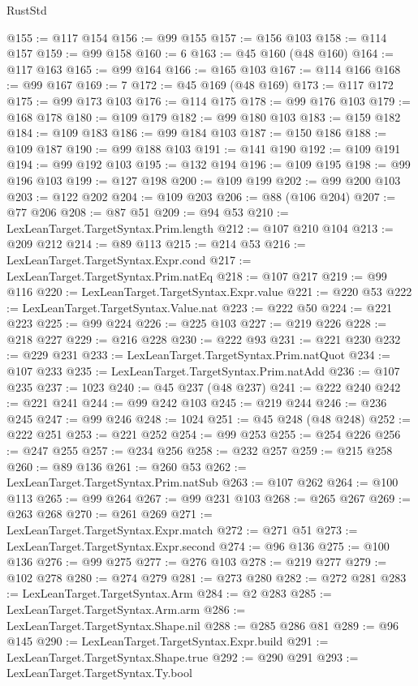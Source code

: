\begin{lexlean}{RustStd}
\begin{coremodule}
@155 := @117 @154
@156 := @99 @155
@157 := @156 @103
@158 := @114 @157
@159 := @99 @158
@160 := 6
@163 := @45 @160 (@48 @160)
@164 := @117 @163
@165 := @99 @164
@166 := @165 @103
@167 := @114 @166
@168 := @99 @167
@169 := 7
@172 := @45 @169 (@48 @169)
@173 := @117 @172
@175 := @99 @173 @103
@176 := @114 @175
@178 := @99 @176 @103
@179 := @168 @178
@180 := @109 @179
@182 := @99 @180 @103
@183 := @159 @182
@184 := @109 @183
@186 := @99 @184 @103
@187 := @150 @186
@188 := @109 @187
@190 := @99 @188 @103
@191 := @141 @190
@192 := @109 @191
@194 := @99 @192 @103
@195 := @132 @194
@196 := @109 @195
@198 := @99 @196 @103
@199 := @127 @198
@200 := @109 @199
@202 := @99 @200 @103
@203 := @122 @202
@204 := @109 @203
@206 := @88 (@106 @204)
@207 := @77 @206
@208 := @87 @51
@209 := @94 @53
@210 := LexLeanTarget.TargetSyntax.Prim.length
@212 := @107 @210 @104
@213 := @209 @212
@214 := @89 @113
@215 := @214 @53
@216 := LexLeanTarget.TargetSyntax.Expr.cond
@217 := LexLeanTarget.TargetSyntax.Prim.natEq
@218 := @107 @217
@219 := @99 @116
@220 := LexLeanTarget.TargetSyntax.Expr.value
@221 := @220 @53
@222 := LexLeanTarget.TargetSyntax.Value.nat
@223 := @222 @50
@224 := @221 @223
@225 := @99 @224
@226 := @225 @103
@227 := @219 @226
@228 := @218 @227
@229 := @216 @228
@230 := @222 @93
@231 := @221 @230
@232 := @229 @231
@233 := LexLeanTarget.TargetSyntax.Prim.natQuot
@234 := @107 @233
@235 := LexLeanTarget.TargetSyntax.Prim.natAdd
@236 := @107 @235
@237 := 1023
@240 := @45 @237 (@48 @237)
@241 := @222 @240
@242 := @221 @241
@244 := @99 @242 @103
@245 := @219 @244
@246 := @236 @245
@247 := @99 @246
@248 := 1024
@251 := @45 @248 (@48 @248)
@252 := @222 @251
@253 := @221 @252
@254 := @99 @253
@255 := @254 @226
@256 := @247 @255
@257 := @234 @256
@258 := @232 @257
@259 := @215 @258
@260 := @89 @136
@261 := @260 @53
@262 := LexLeanTarget.TargetSyntax.Prim.natSub
@263 := @107 @262
@264 := @100 @113
@265 := @99 @264
@267 := @99 @231 @103
@268 := @265 @267
@269 := @263 @268
@270 := @261 @269
@271 := LexLeanTarget.TargetSyntax.Expr.match
@272 := @271 @51
@273 := LexLeanTarget.TargetSyntax.Expr.second
@274 := @96 @136
@275 := @100 @136
@276 := @99 @275
@277 := @276 @103
@278 := @219 @277
@279 := @102 @278
@280 := @274 @279
@281 := @273 @280
@282 := @272 @281
@283 := LexLeanTarget.TargetSyntax.Arm
@284 := @2 @283
@285 := LexLeanTarget.TargetSyntax.Arm.arm
@286 := LexLeanTarget.TargetSyntax.Shape.nil
@288 := @285 @286 @81
@289 := @96 @145
@290 := LexLeanTarget.TargetSyntax.Expr.build
@291 := LexLeanTarget.TargetSyntax.Shape.true
@292 := @290 @291
@293 := LexLeanTarget.TargetSyntax.Ty.bool

\end{coremodule}
\end{lexlean}
